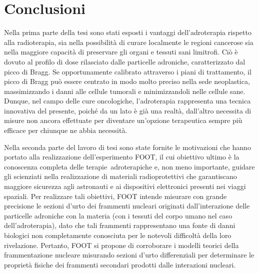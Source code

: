 \documentclass[12pt,a4paper,twoside]{report}
\begin{document}
	\chapter*{Conclusioni}
	Nella prima parte della tesi sono stati esposti i vantaggi dell'adroterapia rispetto alla radioterapia, sia nella possibilità di curare localmente le regioni cancerose sia nella maggiore capacità di preservare gli organi e tessuti sani limitrofi. Ciò è dovuto al profilo di dose rilasciato dalle particelle adroniche, caratterizzato dal picco di Bragg. Se opportunamente calibrato attraverso i piani di trattamento, il picco di Bragg può essere centrato in modo molto preciso nella sede neoplastica, massimizzando i danni alle cellule tumorali e minimizzandoli nelle cellule sane. Dunque, nel campo delle cure oncologiche, l'adroterapia rappresenta una tecnica innovativa del presente, poiché da un lato è già una realtà, dall'altro necessita di misure non ancora effettuate per diventare un'opzione terapeutica sempre più efficace per chiunque ne abbia necessità.
		
	Nella seconda parte del lavoro di tesi sono state fornite le motivazioni che hanno portato alla realizzazione dell'esperimento FOOT, il cui obiettivo ultimo è la conoscenza completa delle terapie adroterapiche e, non meno importante, guidare gli scienziati nella realizzazione di materiali radioprotettivi che garantiscano maggiore sicurezza agli astronauti e ai dispositivi elettronici presenti nei viaggi spaziali. Per realizzare tali obiettivi, FOOT intende misurare con grande precisione le sezioni d'urto dei frammenti nucleari originati dall'interazione delle particelle adroniche con la materia (con i tessuti del corpo umano nel caso dell'adroterapia), dato che tali frammenti rappresentano una fonte di danni biologici non completamente conosciuta per le notevoli difficoltà della loro rivelazione. Pertanto, FOOT si propone di corroborare i modelli teorici della frammentazione nucleare misurando sezioni d'urto differenziali per determinare le proprietà fisiche dei frammenti secondari prodotti dalle interazioni nucleari.
	
\end{document}
